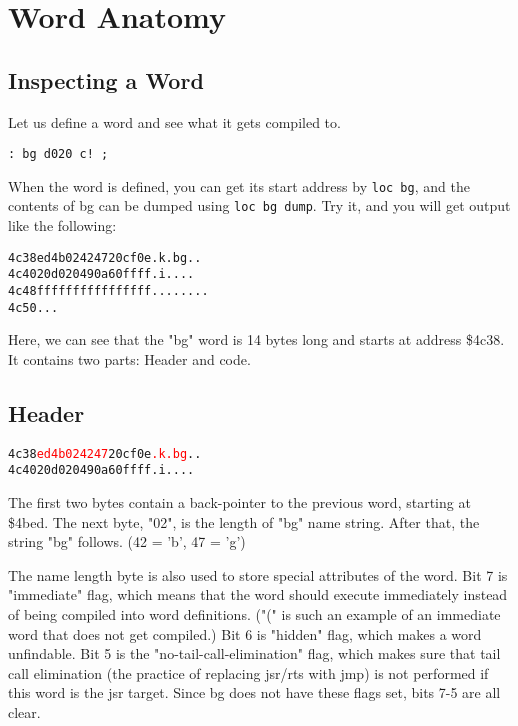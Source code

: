 \chapter{Word Anatomy}

\section{Inspecting a Word}

Let us define a word and see what it gets compiled to.

\begin{verbatim}
: bg d020 c! ;
\end{verbatim}

When the word is defined, you can get its start address by \texttt{loc bg}, and the contents of bg can be dumped using \texttt{loc bg dump}. Try it, and you will get output like the following:

\begin{alltt}
4c38  ed 4b 02 42 47 20 cf 0e .k.bg ..
4c40  20 d0 20 49 0a 60 ff ff  . i....
4c48  ff ff ff ff ff ff ff ff ........
4c50  ...
\end{alltt}

Here, we can see that the "bg" word is 14 bytes long and starts at address \$4c38. It contains two parts: Header and code.

\section{Header}

\begin{alltt}
4c38  \textcolor{red}{ed 4b 02 42 47} 20 cf 0e \textcolor{red}{.k.bg} ..
4c40  20 d0 20 49 0a 60 ff ff  . i....
\end{alltt}

The first two bytes contain a back-pointer to the previous word, starting at \$4bed. The next byte, "02", is the length of "bg" name string. After that, the string "bg" follows. (42 = 'b', 47 = 'g')

The name length byte is also used to store special attributes of the word. Bit 7 is "immediate" flag, which means that the word should execute immediately instead of being compiled into word definitions. ("(" is such an example of an immediate word that does not get compiled.) Bit 6 is "hidden" flag, which makes a word unfindable. Bit 5 is the "no-tail-call-elimination" flag, which makes sure that tail call elimination (the practice of replacing jsr/rts with jmp) is not performed if this word is the jsr target. Since bg does not have these flags set, bits 7-5 are all clear.

